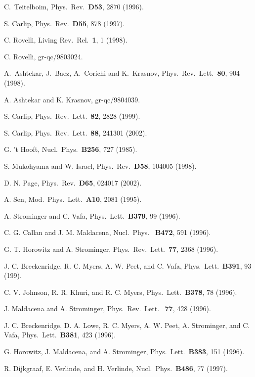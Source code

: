 \documentclass[12pt]{article} \usepackage{latexsym}
\begin{document}
\begin{thebibliography}{99}
 C.~Teitelboim, Phys.\ Rev.\ {\bf D53}, 2870 (1996).

 S. Carlip, Phys.\ Rev.\ {\bf D55}, 878 (1997).

 C. Rovelli, Living Rev.\ Rel.\ {\bf 1}, 1 (1998).

 C. Rovelli, gr-qc/9803024.

 A.~Ashtekar, J.~Baez, A.~Corichi and K.~Krasnov, Phys.\
  Rev.\ Lett.\ {\bf 80}, 904 (1998).

 A. Ashtekar and K. Krasnov, gr-qc/9804039. 

 S. Carlip, Phys.\ Rev.\ Lett.\ {\bf 82}, 2828 (1999).

 S. Carlip, Phys.\ Rev.\ Lett.\ {\bf 88}, 241301
  (2002).

 G. 't Hooft, Nucl.\ Phys.\ {\bf B256}, 727 (1985).

 S. Mukohyama and W. Israel, Phys.\ Rev.\ {\bf D58},
  104005 (1998).

 D. N. Page, Phys.\ Rev.\ {\bf D65}, 024017 (2002).

 A. Sen, Mod.\ Phys.\ Lett.\ {\bf A10}, 2081 (1995).

 A. Strominger and C. Vafa, Phys.\ Lett.\ {\bf B379}, 99
  (1996).

 C. G. Callan and J. M. Maldacena, Nucl.\ Phys.\ {\bf
  B472}, 591 (1996).

 G. T. Horowitz and A. Strominger, Phys.\ Rev.\ Lett.\
{\bf 77}, 2368 (1996).

 J. C. Breckenridge, R. C. Myers, A. W. Peet, and
  C. Vafa, Phys.\ Lett.\ {\bf B391}, 93 (199).

 C. V. Johnson, R. R. Khuri, and R. C. Myers, Phys.\
  Lett.\ {\bf B378}, 78 (1996).

\bibitem{MSt} J. Maldacena and A. Strominger, Phys.\ Rev.\ Lett.\ {\bf
  77}, 428 (1996).

\bibitem{BLMPSV} J. C. Breckenridge, D. A. Lowe, R. C. Myers,
  A. W. Peet, A. Strominger, and C. Vafa, Phys.\ Lett.\ {\bf B381},
  423 (1996).

\bibitem{HMS} G. Horowitz, J. Maldacena, and A. Strominger, Phys.\
  Lett.\ {\bf B383}, 151 (1996).

 R. Dijkgraaf, E. Verlinde, and H. Verlinde, Nucl.\
  Phys.\ {\bf B486}, 77 (1997).


\end{thebibliography}
\end{document}
